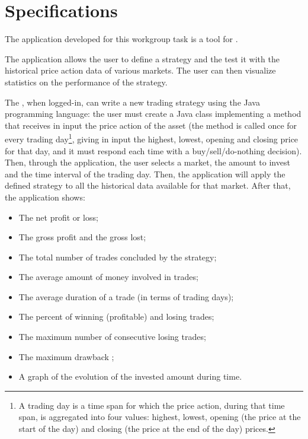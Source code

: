 \chapter{Specifications}

The application developed for this workgroup task is a tool for
.

The application allows the user to define a strategy and the test it with the
historical price action data of various markets. The user can then visualize
statistics on the performance of the strategy.

The , when logged-in, can write a new trading strategy using the
Java programming language: the user must create a Java class implementing a
method that receives in input the price action of the asset (the method is
called once for every trading day\footnote{A trading day is a time span for
which the price action, during that time span, is aggregated into four values:
highest, lowest, opening (the price at the start of the day) and closing (the
price at the end of the day) prices.}, giving in input the highest, lowest,
opening and closing price for that day, and it must respond each time with a
buy/sell/do-nothing decision). Then, through the application, the user selects a
market, the amount to invest and the time interval of the trading day. Then, the
application will apply the defined strategy to all the historical data available
for that market.  After that, the application shows:

\begin{itemize}
	\item The net profit or loss;
	\item The gross profit  and the gross lost;
	\item The total number of trades concluded by the strategy;
	\item The average amount of money involved in trades;
	\item The average duration of a trade (in terms of trading days);
	\item The percent of winning (profitable) and losing trades;
	\item The maximum number of consecutive losing trades;
	\item The maximum drawback ;
	\item A graph of the evolution of the invested amount during time.
\end{itemize}

